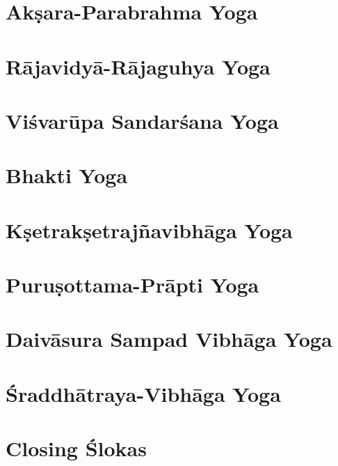 \documentclass{scrbook}
\begin{document}
\chapter{Akṣara-Parabrahma Yoga}
\begin{multicols}{2}
    
\end{multicols}

\chapter{Rājavidyā-Rājaguhya Yoga}
\begin{multicols}{2}
    
\end{multicols}

\setcounter{chapter}{10}

\chapter{Viśvarūpa Sandarśana Yoga}
\begin{multicols}{2}
    
\end{multicols}

\chapter{Bhakti Yoga}
\begin{multicols}{2}
    
\end{multicols}

\chapter{Kṣetrakṣetrajñavibhāga Yoga}
\begin{multicols}{2}
    
\end{multicols}

\setcounter{chapter}{14}

\chapter{Puruṣottama-Prāpti Yoga}
\begin{multicols}{2}
    
\end{multicols}

\chapter{Daivāsura Sampad Vibhāga Yoga}
\begin{multicols}{2}
    
\end{multicols}

\chapter{Śraddhātraya-Vibhāga Yoga}
\begin{multicols}{2}
    
\end{multicols}

\backmatter
\chapter{Closing Ślokas}

\end{document}

